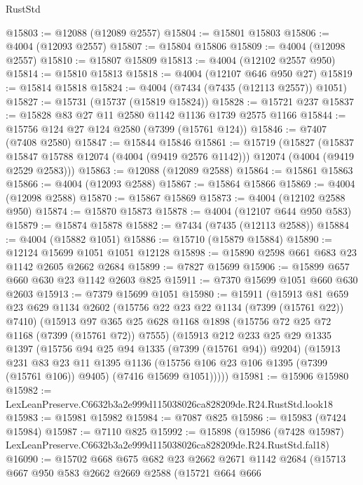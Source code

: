 \begin{lexlean}{RustStd}
\begin{coremodule}
@15803 := @12088 (@12089 @2557)
@15804 := @15801 @15803
@15806 := @4004 (@12093 @2557)
@15807 := @15804 @15806
@15809 := @4004 (@12098 @2557)
@15810 := @15807 @15809
@15813 := @4004 (@12102 @2557 @950)
@15814 := @15810 @15813
@15818 := @4004 (@12107 @646 @950 @27)
@15819 := @15814 @15818
@15824 := @4004 (@7434 (@7435 (@12113 @2557)) @1051)
@15827 := @15731 (@15737 (@15819 @15824))
@15828 := @15721 @237
@15837 := @15828 @83 @27 @11 @2580 @1142 @1136 @1739 @2575 @1166
@15844 := @15756 @124 @27 @124 @2580 (@7399 (@15761 @124))
@15846 := @7407 (@7408 @2580)
@15847 := @15844 @15846
@15861 := @15719
    (@15827
      (@15837 @15847 @15788 @12074 (@4004 (@9419 @2576 @1142)))
      @12074
      (@4004 (@9419 @2529 @2583)))
@15863 := @12088 (@12089 @2588)
@15864 := @15861 @15863
@15866 := @4004 (@12093 @2588)
@15867 := @15864 @15866
@15869 := @4004 (@12098 @2588)
@15870 := @15867 @15869
@15873 := @4004 (@12102 @2588 @950)
@15874 := @15870 @15873
@15878 := @4004 (@12107 @644 @950 @583)
@15879 := @15874 @15878
@15882 := @7434 (@7435 (@12113 @2588))
@15884 := @4004 (@15882 @1051)
@15886 := @15710 (@15879 @15884)
@15890 := @12124 @15699 @1051 @1051 @12128
@15898 := @15890 @2598 @661 @683 @23 @1142 @2605 @2662 @2684
@15899 := @7827 @15699
@15906 := @15899 @657 @660 @630 @23 @1142 @2603 @825
@15911 := @7370 @15699 @1051 @660 @630 @2603
@15913 := @7379 @15699 @1051
@15980 := @15911
    (@15913
      @81
      @659
      @23
      @629
      @1134
      @2602
      (@15756 @22 @23 @22 @1134 (@7399 (@15761 @22)) @7410)
      (@15913
        @97
        @365
        @25
        @628
        @1168
        @1898
        (@15756 @72 @25 @72 @1168 (@7399 (@15761 @72)) @7555)
        (@15913
          @212
          @233
          @25
          @29
          @1335
          @1397
          (@15756 @94 @25 @94 @1335 (@7399 (@15761 @94)) @9204)
          (@15913
            @231
            @83
            @23
            @11
            @1395
            @1136
            (@15756 @106 @23 @106 @1395 (@7399 (@15761 @106)) @9405)
            (@7416 @15699 @1051)))))
@15981 := @15906 @15980
@15982 := LexLeanPreserve.C6632b3a2e999d115038026ca828209de.R24.RustStd.look18
@15983 := @15981 @15982
@15984 := @7087 @825
@15986 := @15983 (@7424 @15984)
@15987 := @7110 @825
@15992 := @15898
    (@15986 (@7428 @15987) LexLeanPreserve.C6632b3a2e999d115038026ca828209de.R24.RustStd.fal18)
@16090 := @15702
    @668
    @675
    @682
    @23
    @2662
    @2671
    @1142
    @2684
    (@15713
      @667
      @950
      @583
      @2662
      @2669
      @2588
      (@15721
        @664
        @666

\end{coremodule}
\end{lexlean}
